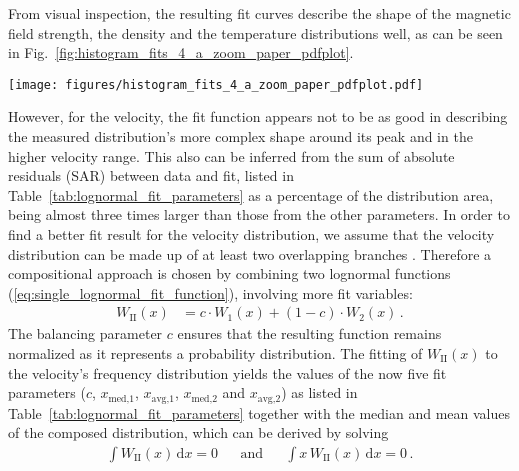 \documentclass[]{aa}
\begin{document}
        From visual inspection, the resulting fit curves describe the shape of the magnetic field strength, the density and the temperature distributions well, as can be seen in Fig.~\ref{fig:histogram_fits_4_a_zoom_paper_pdfplot}.
        \begin{figure*}
                \texttt{[image: figures/histogram\_fits\_4\_a\_zoom\_paper\_pdfplot.pdf]}
                \caption{Frequency distributions of the four solar-wind parameters and their lognormal fits derived from the hourly OMNI data set. The histograms have bins of \SI{0.5}{\nT}, \SI{10}{\km\per\s}, \SI{1}{\per\cm\cubed} and \SI{10000}{\K}. The fits' median and mean values are indicated as well. The insets show zoomed-in views of the high-value tails of the distributions.}
                \label{fig:histogram_fits_4_a_zoom_paper_pdfplot}
        \end{figure*}
        However, for the velocity, the fit function appears not to be as good in describing the measured distribution’s more complex shape around its peak and in the higher velocity range. This also can be inferred from the sum of absolute residuals (SAR) between data and fit, listed in Table~\ref{tab:lognormal_fit_parameters} as a percentage of the distribution area, being almost three times larger than those from the other parameters.
        In order to find a better fit result for the velocity distribution, we assume that the velocity distribution can be made up of at least two overlapping branches \citep{McGregor2011b}. Therefore a compositional approach  is chosen by combining two lognormal functions (\ref{eq:single_lognormal_fit_function}), involving more fit variables:
        \begin{align}
                W_\text{II}(x) &= c \cdot W_1(x) + (1 -c) \cdot W_2(x)\,.       \label{eq:double_lognormal_fit_function}
        \end{align}
        The balancing parameter $c$ ensures that the resulting function remains normalized as it represents a probability distribution.
        The fitting of $W_\text{II}(x)$ to the velocity's frequency distribution yields the values of the now five fit parameters ($c$, $x_\text{med,1}$, $x_\text{avg,1}$, $x_\text{med,2}$ and $x_\text{avg,2}$) as listed in Table~\ref{tab:lognormal_fit_parameters} together with the median and mean values of the composed distribution, which can be derived by solving
        \begin{align}
                \int W_\text{II}(x)\,\text{d}x = 0      &       &\text{and}     &       &\int x\,W_\text{II}(x)\,\text{d}x = 0        \,.
        \end{align}
\end{document}
